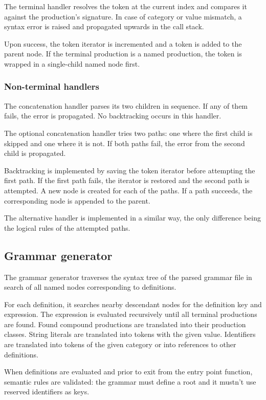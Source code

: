 \documentclass{article}
\begin{document}
	The terminal handler resolves the token at the current index and compares
	it against the production's signature. In case of category or value
	mismatch, a syntax error is raised and propagated upwards in the call stack.

	Upon success, the token iterator is incremented and a token is added to the
	parent node. If the terminal production is a named production, the token
	is wrapped in a single-child named node first.

	\subsubsection{Non-terminal handlers}

	The concatenation handler parses its two children in sequence. If any of
	them fails, the error is propagated. No backtracking occurs in this handler.

	The optional concatenation handler tries two paths: one where the first
	child is skipped and one where it is not. If both paths fail, the error
	from the second child is propagated.

	Backtracking is implemented by saving the token iterator before attempting
	the first path. If the first path fails, the iterator is restored and the
	second path is attempted. A new node is created for each of the paths.
	If a path succeeds, the corresponding node is appended to the parent.

	The alternative handler is implemented in a similar way, the only difference
	being the logical rules of the attempted paths.

	\subsection{Grammar generator}

	The grammar generator traverses the syntax tree of the parsed grammar file
	in search of all named nodes corresponding to definitions.

	For each definition, it searches nearby descendant nodes for the definition
	key and expression. The expression is evaluated recursively until all
	terminal productions are found. Found compound productions are translated
	into their production classes. String literals are translated into tokens
	with the given value. Identifiers are translated into tokens of the given
	category or into references to other definitions.

	When definitions are evaluated and prior to exit from the entry point
	function, semantic rules are validated: the grammar must define a root
	and it mustn't use reserved identifiers as keys.
\end{document}
